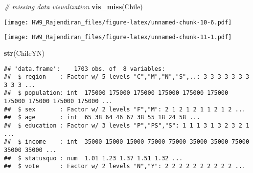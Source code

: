 \documentclass[]{article}
\newenvironment{Shaded}{\begin{snugshade}}{\end{snugshade}}
\newcommand{\CommentTok}[1]{\textcolor[rgb]{0.56,0.35,0.01}{\textit{#1}}}
\newcommand{\DataTypeTok}[1]{\textcolor[rgb]{0.13,0.29,0.53}{#1}}
\newcommand{\DecValTok}[1]{\textcolor[rgb]{0.00,0.00,0.81}{#1}}
\newcommand{\KeywordTok}[1]{\textcolor[rgb]{0.13,0.29,0.53}{\textbf{#1}}}
\newcommand{\NormalTok}[1]{#1}
\newcommand{\OperatorTok}[1]{\textcolor[rgb]{0.81,0.36,0.00}{\textbf{#1}}}
\newcommand{\StringTok}[1]{\textcolor[rgb]{0.31,0.60,0.02}{#1}}
\begin{document}
\begin{Shaded}
\begin{Highlighting}[]
\CommentTok{# missing data visualization}
\KeywordTok{vis_miss}\NormalTok{(Chile)}
\end{Highlighting}
\end{Shaded}

\texttt{[image: HW9\_Rajendiran\_files/figure-latex/unnamed-chunk-10-6.pdf]}

\begin{Shaded}
\end{Shaded}

\texttt{[image: HW9\_Rajendiran\_files/figure-latex/unnamed-chunk-11-1.pdf]}

\begin{Shaded}
\begin{Highlighting}[]
\KeywordTok{str}\NormalTok{(ChileYN)}
\end{Highlighting}
\end{Shaded}

\begin{verbatim}
## 'data.frame':    1703 obs. of  8 variables:
##  $ region    : Factor w/ 5 levels "C","M","N","S",..: 3 3 3 3 3 3 3 3 3 3 ...
##  $ population: int  175000 175000 175000 175000 175000 175000 175000 175000 175000 175000 ...
##  $ sex       : Factor w/ 2 levels "F","M": 2 1 2 1 2 1 1 2 1 2 ...
##  $ age       : int  65 38 64 46 67 38 55 18 24 58 ...
##  $ education : Factor w/ 3 levels "P","PS","S": 1 1 1 3 1 3 2 3 2 1 ...
##  $ income    : int  35000 15000 15000 75000 75000 35000 35000 75000 35000 35000 ...
##  $ statusquo : num  1.01 1.23 1.37 1.51 1.32 ...
##  $ vote      : Factor w/ 2 levels "N","Y": 2 2 2 2 2 2 2 2 2 2 ...
\end{verbatim}
\end{document}
